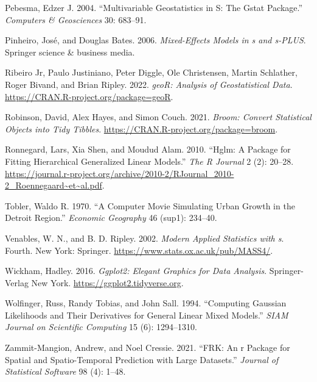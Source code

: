 \documentclass{article}
\newlength{\cslhangindent}
\newlength{\cslentryspacingunit} %
\newenvironment{CSLReferences}[2] %
 {%
  \setlength{\parindent}{0pt}
  \ifodd #1
  \let\oldpar\par
  \def\par{\hangindent=\cslhangindent\oldpar}
  \fi
  \setlength{\parskip}{#2\cslentryspacingunit}
 }%
 {}
\begin{document}
\begin{CSLReferences}{1}{0}
\leavevmode\hypertarget{ref-pebesma2004gstat}{}%
Pebesma, Edzer J. 2004. {``Multivariable Geostatistics in {S}: The Gstat
Package.''} \emph{Computers \& Geosciences} 30: 683--91.

\leavevmode\hypertarget{ref-pinheiro2006mixed}{}%
Pinheiro, José, and Douglas Bates. 2006. \emph{Mixed-Effects Models in s
and s-PLUS}. Springer science \& business media.

\leavevmode\hypertarget{ref-ribiero2022geoR}{}%
Ribeiro Jr, Paulo Justiniano, Peter Diggle, Ole Christensen, Martin
Schlather, Roger Bivand, and Brian Ripley. 2022. \emph{geoR: Analysis of
Geostatistical Data}. \url{https://CRAN.R-project.org/package=geoR}.

\leavevmode\hypertarget{ref-robinson2021broom}{}%
Robinson, David, Alex Hayes, and Simon Couch. 2021. \emph{Broom: Convert
Statistical Objects into Tidy Tibbles}.
\url{https://CRAN.R-project.org/package=broom}.

\leavevmode\hypertarget{ref-ronnegard2010hglm}{}%
Ronnegard, Lars, Xia Shen, and Moudud Alam. 2010. {``Hglm: A Package for
Fitting Hierarchical Generalized Linear Models.''} \emph{The R Journal}
2 (2): 20--28.
\url{https://journal.r-project.org/archive/2010-2/RJournal_2010-2_Roennegaard~et~al.pdf}.

\leavevmode\hypertarget{ref-tobler1970computer}{}%
Tobler, Waldo R. 1970. {``A Computer Movie Simulating Urban Growth in
the Detroit Region.''} \emph{Economic Geography} 46 (sup1): 234--40.

\leavevmode\hypertarget{ref-venables2002S}{}%
Venables, W. N., and B. D. Ripley. 2002. \emph{Modern Applied Statistics
with s}. Fourth. New York: Springer.
\url{https://www.stats.ox.ac.uk/pub/MASS4/}.

\leavevmode\hypertarget{ref-wickham2016ggplot2}{}%
Wickham, Hadley. 2016. \emph{Ggplot2: Elegant Graphics for Data
Analysis}. Springer-Verlag New York.
\url{https://ggplot2.tidyverse.org}.

\leavevmode\hypertarget{ref-wolfinger1994computing}{}%
Wolfinger, Russ, Randy Tobias, and John Sall. 1994. {``Computing
Gaussian Likelihoods and Their Derivatives for General Linear Mixed
Models.''} \emph{SIAM Journal on Scientific Computing} 15 (6):
1294--1310.

\leavevmode\hypertarget{ref-zammitmangion2021FRK}{}%
Zammit-Mangion, Andrew, and Noel Cressie. 2021. {``FRK: An r Package for
Spatial and Spatio-Temporal Prediction with Large Datasets.''}
\emph{Journal of Statistical Software} 98 (4): 1--48.

\end{CSLReferences}
\end{document}
